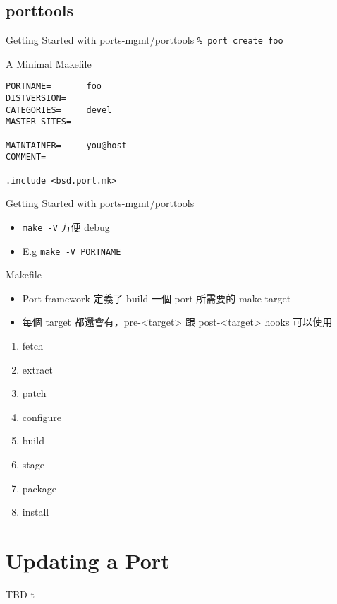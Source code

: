 \documentclass[aspectratio=169]{beamer}
\begin{document}
\subsection{porttools}
\begin{frame}[t,fragile]{Getting Started with ports-mgmt/porttools}
  \verb|% port create foo|

  \begin{block}{A Minimal Makefile} \begin{verbatim}
PORTNAME=       foo
DISTVERSION=
CATEGORIES=     devel
MASTER_SITES=

MAINTAINER=     you@host
COMMENT=

.include <bsd.port.mk> \end{verbatim}
  \end{block}
\end{frame}

\begin{frame}[t,fragile]{Getting Started with ports-mgmt/porttools}
  \begin{itemize}
    \item \verb|make -V| 方便 debug
    \item E.g \verb|make -V PORTNAME|
  \end{itemize}
\end{frame}

\begin{frame}[t]{Makefile}
  \begin{itemize}
    \item Port framework 定義了 build 一個 port 所需要的 make target
    \item 每個 target 都還會有，pre-<target> 跟 post-<target> hooks 可以使用
  \end{itemize}
  \begin{enumerate}
    \item fetch
    \item extract
    \item patch
    \item configure
    \item build
    \item stage
    \item package
    \item install
  \end{enumerate}
\end{frame}

\section{Updating a Port}
\begin{frame}[t]{TBD}
  t
\end{frame}
\end{document}

